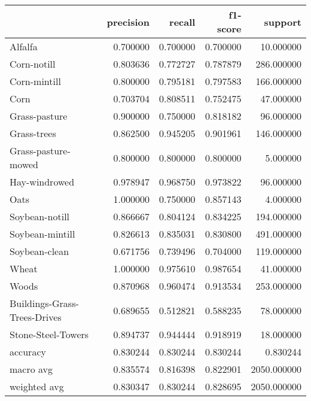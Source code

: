 \begin{tabular}{lrrrr}
\toprule
{} &  precision &    recall &  f1-score &      support \\
\midrule
Alfalfa                      &   0.700000 &  0.700000 &  0.700000 &    10.000000 \\
Corn-notill                  &   0.803636 &  0.772727 &  0.787879 &   286.000000 \\
Corn-mintill                 &   0.800000 &  0.795181 &  0.797583 &   166.000000 \\
Corn                         &   0.703704 &  0.808511 &  0.752475 &    47.000000 \\
Grass-pasture                &   0.900000 &  0.750000 &  0.818182 &    96.000000 \\
Grass-trees                  &   0.862500 &  0.945205 &  0.901961 &   146.000000 \\
Grass-pasture-mowed          &   0.800000 &  0.800000 &  0.800000 &     5.000000 \\
Hay-windrowed                &   0.978947 &  0.968750 &  0.973822 &    96.000000 \\
Oats                         &   1.000000 &  0.750000 &  0.857143 &     4.000000 \\
Soybean-notill               &   0.866667 &  0.804124 &  0.834225 &   194.000000 \\
Soybean-mintill              &   0.826613 &  0.835031 &  0.830800 &   491.000000 \\
Soybean-clean                &   0.671756 &  0.739496 &  0.704000 &   119.000000 \\
Wheat                        &   1.000000 &  0.975610 &  0.987654 &    41.000000 \\
Woods                        &   0.870968 &  0.960474 &  0.913534 &   253.000000 \\
Buildings-Grass-Trees-Drives &   0.689655 &  0.512821 &  0.588235 &    78.000000 \\
Stone-Steel-Towers           &   0.894737 &  0.944444 &  0.918919 &    18.000000 \\
accuracy                     &   0.830244 &  0.830244 &  0.830244 &     0.830244 \\
macro avg                    &   0.835574 &  0.816398 &  0.822901 &  2050.000000 \\
weighted avg                 &   0.830347 &  0.830244 &  0.828695 &  2050.000000 \\
\bottomrule
\end{tabular}
